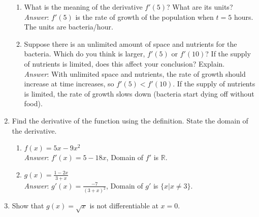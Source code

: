 \documentclass[11pt]{article}
\begin{document}
\begin{enumerate}
\begin{enumerate}

\item What is the meaning of the derivative $f'(5)$? What are its units?\\

{\em Answer}: $f'(5)$ is the rate of growth of the population when $t=5$ hours. The units are bacteria/hour. \\

\item Suppose there is an unlimited amount of space and nutrients for the bacteria. Which do you think is larger, $f'(5)$ or $f'(10)$? If the supply of nutrients is limited, does this affect your conclusion? Explain.\\

{\em Answer}:  With unlimited space and nutrients, the rate of growth should increase at time increases, so $f'(5)<f'(10)$. If the supply of nutrients is limited, the rate of growth slows down (bacteria start dying off without food).\\

\end{enumerate}

\item Find the derivative of the function using the definition. State the domain of the derivative. \\

\begin{enumerate}

\item $f(x)=5x-9x^2$\\

{\em Answer}: $f'(x)=5-18x$, Domain of $f'$ is $\mathbb{R}$.\\

\item $g(x)=\frac{1-2x}{3+x}$\\

{\em Answer}: $g'(x)=\frac{-7}{(3+x)^2}$, Domain of $g'$ is $\{x|x\neq 3\}.$\\



\end{enumerate}

\item Show that $g(x)=\sqrt{x}$ is not differentiable at $x=0$.\\


\end{enumerate}
\end{document}
